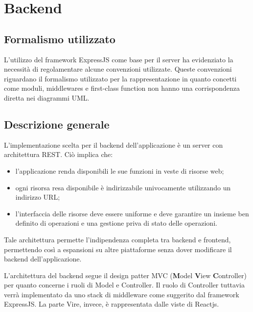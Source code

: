 \section{Backend}
\subsection{Formalismo utilizzato}
L'utilizzo del framework ExpressJS come base per il server ha evidenziato la necessità di regolamentare alcune convenzioni utilizzate. Queste convenzioni riguardano il formalismo utilizzato per la rappresentazione in quanto concetti come moduli, middlewares e first-class function non hanno una corrispondenza diretta nei diagrammi UML.


\subsection{Descrizione generale}
L'implementazione scelta per il backend dell'applicazione è un server con architettura REST. Ciò implica che:
\begin{itemize}
\item l'applicazione renda disponibili le sue funzioni in veste di risorse web;
\item ogni risorsa resa disponibile è indirizzabile univocamente utilizzando un indirizzo URL;
\item l'interfaccia delle risorse deve essere uniforme e deve garantire un insieme ben definito di operazioni e una gestione priva di stato delle operazioni.
\end{itemize}

Tale architettura permette l'indipendenza completa tra backend e frontend, permettendo così a espansioni su altre piattaforme senza dover modificare il backend dell'applicazione.

L'architettura del backend segue il design patter MVC (\textbf{M}odel \textbf{V}iew \textbf{C}ontroller) per quanto concerne i ruoli di Model e Controller. 
Il ruolo di Controller tuttavia verrà implementato da uno stack di middleware come suggerito dal framework ExpressJS.
La parte Vire, invece, è rappresentata dalle viste di Reactjs.

